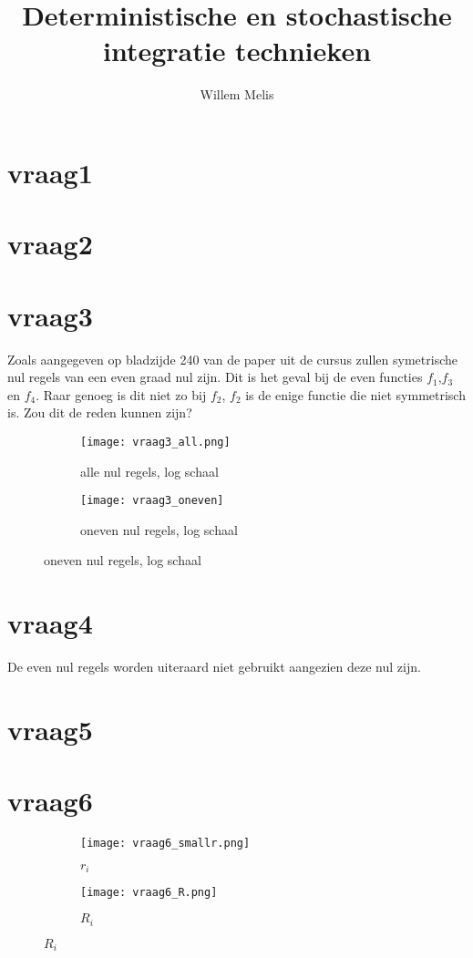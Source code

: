 \documentclass[11pt]{article} %
\title{Deterministische en stochastische integratie technieken}
\author{Willem Melis}
\begin{document}
\maketitle
\newpage
\newpage
\section{vraag1}
\section{vraag2}
\section{vraag3}

Zoals aangegeven op bladzijde 240 van de paper uit de cursus zullen symetrische nul regels van een even graad nul zijn. Dit is het geval bij de even functies $f_1$,$f_3$ en $f_4$. Raar genoeg is dit niet zo bij $f_2$, $f_2$ is de enige functie die niet symmetrisch is. Zou dit de reden kunnen zijn?

\begin{figure}[H]
	\centering
	\begin{subfigure}[b]{0.45\textwidth}
		\texttt{[image: vraag3\_all.png]}
		\caption{alle nul regels, log schaal}
	\end{subfigure}
	\begin{subfigure}[b]{0.45\textwidth}
		\texttt{[image: vraag3\_oneven]}
		\caption{oneven nul regels, log schaal}
	\end{subfigure}
\end{figure}

\section{vraag4}
De even nul regels worden uiteraard niet gebruikt aangezien deze nul zijn.
\section{vraag5}
\section{vraag6}
\begin{figure}[H]
	\centering
	\begin{subfigure}[b]{0.45\textwidth}
		\texttt{[image: vraag6\_smallr.png]}
		\caption{$r_i$}
	\end{subfigure}
	\begin{subfigure}[b]{0.45\textwidth}
		\texttt{[image: vraag6\_R.png]}
		\caption{$R_i$}
	\end{subfigure}
\end{figure}

			
\end{document}
